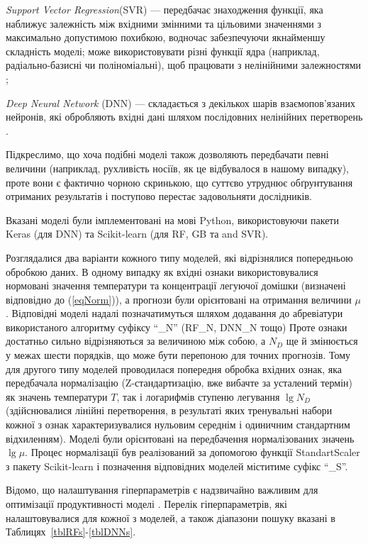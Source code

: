 \documentclass[14pt,a4paper,titlepage,oneside]{book}
\numberwithin{equation}{part}
\begin{document}
\noindent
\emph{Support Vector Regression}(SVR) --- передбачає знаходження функції, яка наближує залежність між вхідними змінними та цільовими значеннями з максимально допустимою похибкою, водночас забезпечуючи якнайменшу складність моделі;
може використовувати різні функції ядра (наприклад, радіально-базисні чи поліноміальні), щоб працювати з нелінійними залежностями \cite{Cao2020};

\noindent
\emph{Deep Neural Network} (DNN) --- складається з декількох шарів взаємопов'язаних нейронів, які обробляють вхідні дані
шляхом послідовних нелінійних перетворень \cite{Liu2023}.

Підкреслимо, що хоча подібні моделі також дозволяють передбачати певні величини (наприклад, рухливість носіїв,
як це відбувалося в нашому випадку), проте вони є фактично чорною скринькою, що суттєво утруднює обґрунтування отриманих результатів
і поступово перестає задовольняти дослідників.


Вказані моделі були імплементовані на мові Python,
використовуючи пакети Keras (для DNN) та Scikit-learn (для RF, GB та and SVR).

Розглядалися два варіанти кожного типу моделей, які відрізнялися попередньою обробкою даних.
В одному випадку як вхідні ознаки використовувалися нормовані значення температури та концентрації легуючої домішки
(визначені відповідно до (\ref{eqNorm})), а прогнози були орієнтовані на отримання величини $\mu$.
Відповідні моделі надалі позначатимуться шляхом додавання до абревіатури використаного алгоритму суфіксу ``\_N'' (RF\_N, DNN\_N тощо)
Проте ознаки достатньо сильно відрізняються за величиною між собою, а $N_D$ ще й змінюється у межах шести порядків,
що може бути перепоною для точних прогнозів.
Тому для другого типу моделей проводилася попередня обробка вхідних ознак, яка передбачала нормалізацію (Z-стандартизацію, вже вибачте за усталений термін)
як значень температури $T$,
так і логарифмів ступеню легування $\lg N_D$
(здійснювалися лінійні перетворення, в результаті яких тренувальні набори кожної з ознак характеризувалися нульовим середнім і одиничним стандартним відхиленням).
Моделі були орієнтовані на передбачення нормалізованих значень $\lg \mu$.
Процес нормалізації був реалізований за допомогою функції StandartScaler з пакету Scikit-learn і позначення відповідних моделей міститиме суфікс ``\_S''.

Відомо, що налаштування гіперпараметрів  є надзвичайно важливим для оптимізації продуктивності моделі \cite{Hanif2024}.
Перелік гіперпараметрів, які налаштовувалися для кожної з моделей, а також діапазони пошуку вказані в Таблицях~\ref{tblRFs}-\ref{tblDNNs}.
\end{document}
